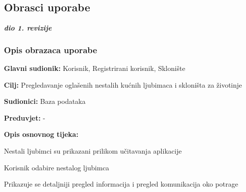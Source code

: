 			\eject 
			
			
				
			\subsection{Obrasci uporabe}
				
				\textbf{\textit{dio 1. revizije}}
				
				\subsubsection{Opis obrazaca uporabe}		

					\noindent {}
					\begin{packed_item}
	
						\item \textbf{Glavni sudionik: }Korisnik, Registrirani korisnik, Sklonište
						\item  \textbf{Cilj:} Pregledavanje oglašenih nestalih kućnih ljubimaca i skloništa za životinje
						\item  \textbf{Sudionici:} Baza podataka
						\item  \textbf{Preduvjet:} -
						\item  \textbf{Opis osnovnog tijeka:}
						
						\item[] \begin{packed_enum}
	
							\item Nestali ljubimci su prikazani prilikom učitavanja aplikacije
							\item Korisnik odabire nestalog ljubimca
							\item Prikazuje se detaljniji pregled informacija i pregled komunikacija oko potrage
						\end{packed_enum}
						
					\end{packed_item}
				
